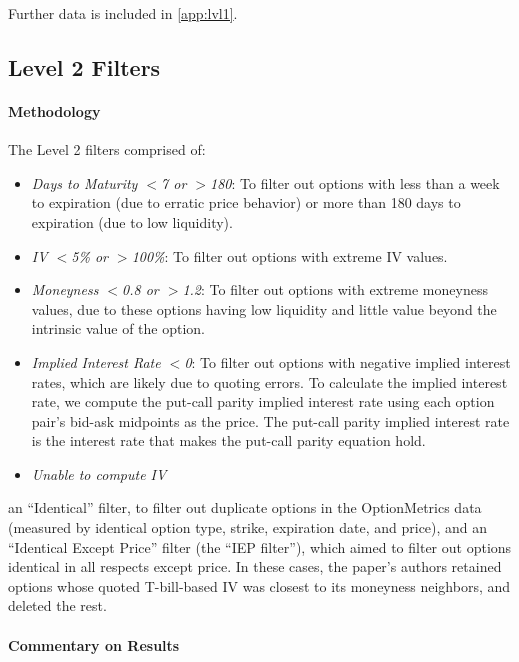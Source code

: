 Further data is included in \autoref{app:lvl1}. 


\subsection {Level 2 Filters}

\paragraph{Methodology}

The Level 2 filters comprised of: 
\begin{itemize}
  \item \textit{Days to Maturity $<$7 or $>$180}: To filter out options with less than a week to expiration (due to erratic price behavior) or more than 180 days to expiration (due to low liquidity).
  \item \textit{IV $<$5\% or $>$100\%}: To filter out options with extreme IV values.
  \item \textit{Moneyness $<$0.8 or $>$1.2}: To filter out options with extreme moneyness values, due to these options having low liquidity and little value beyond the intrinsic value of the option.
  \item \textit{Implied Interest Rate $<$0}: To filter out options with negative implied interest rates, which are likely due to quoting errors. To calculate the implied interest rate, we compute the put-call parity implied interest rate using each option pair's bid-ask midpoints as the price. The put-call parity implied interest rate is the interest rate that makes the put-call parity equation hold.   
  \item \textit{Unable to compute IV}
\end{itemize}


an ``Identical'' filter, to filter out duplicate options in the OptionMetrics data (measured by identical option type, strike, expiration date, and price), and an ``Identical Except Price'' filter (the ``IEP filter''), which aimed to filter out options identical in all respects except price. In these cases, the paper's authors retained options whose quoted T-bill-based IV was closest to its moneyness neighbors, and deleted the rest.

\paragraph{Commentary on Results}

